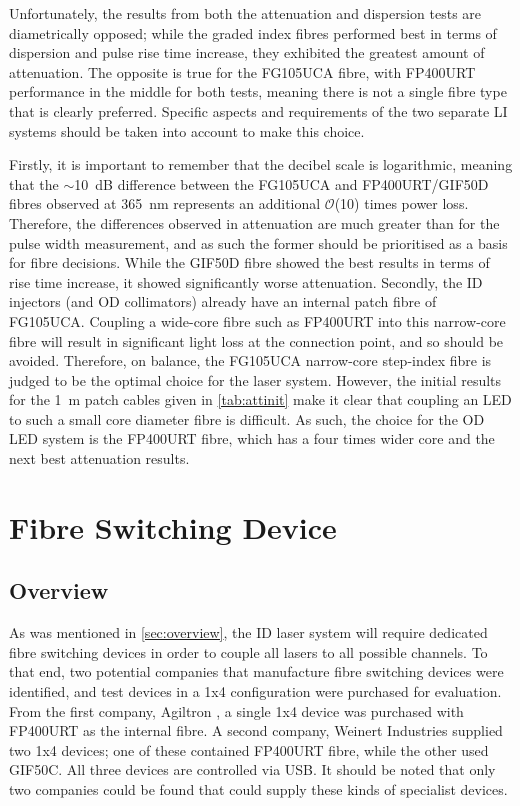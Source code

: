\documentclass[a4paper,11pt]{article}
\let\oldsim\sim
\renewcommand{\sim}{{\oldsim}}
\begin{document}
Unfortunately, the results from both the attenuation and dispersion tests are diametrically opposed; while the graded index fibres performed best in terms of dispersion and pulse rise time increase, they exhibited the greatest amount of attenuation. The opposite is true for the FG105UCA fibre, with FP400URT performance in the middle for both tests, meaning there is not a single fibre type that is clearly preferred. Specific aspects and requirements of the two separate LI systems should be taken into account to make this choice.

Firstly, it is important to remember that the decibel scale is logarithmic, meaning that the $\sim$10~dB difference between the FG105UCA and FP400URT/GIF50D fibres observed at 365~nm represents an additional $\mathcal{O}$(10) times power loss. Therefore, the differences observed in attenuation are much greater than for the pulse width measurement, and as such the former should be prioritised as a basis for fibre decisions. While the GIF50D fibre showed the best results in terms of rise time increase, it showed significantly worse attenuation. Secondly, the ID injectors (and OD collimators) already have an internal patch fibre of FG105UCA. Coupling a wide-core fibre such as FP400URT into this narrow-core fibre will result in significant light loss at the connection point, and so should be avoided. Therefore, on balance, the FG105UCA narrow-core step-index fibre is judged to be the optimal choice for the laser system. However, the initial results for the 1~m patch cables given in \cref{tab:attinit} make it clear that coupling an LED to such a small core diameter fibre is difficult. As such, the choice for the OD LED system is the FP400URT fibre, which has a four times wider core and the next best attenuation results.



\section{Fibre Switching Device}\label{sec:switch}

\subsection{Overview}
As was mentioned in \cref{sec:overview}, the ID laser system will require dedicated fibre switching devices in order to couple all lasers to all possible channels. To that end, two potential companies that manufacture fibre switching devices were identified, and test devices in a 1x4 configuration were purchased for evaluation. From the first company, Agiltron \cite{bib:agiltron}, a single 1x4 device was purchased with FP400URT as the internal fibre. A second company, Weinert Industries \cite{bib:weinert} supplied two 1x4 devices; one of these contained FP400URT fibre, while the other used GIF50C. All three devices are controlled via USB. It should be noted that only two companies could be found that could supply these kinds of specialist devices.
\end{document}
